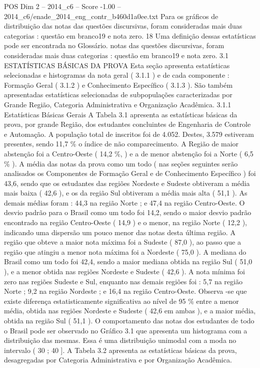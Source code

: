 \begin{textsample}{POS Dim 2 – 2014\_c6 – Score -1.00 – 2014\_c6/enade\_2014\_eng\_contr\_b460d1a0ee.txt}
Para os gráficos de distribuição das notas das questões discursivas, foram consideradas mais duas categorias : questão em branco19 e nota zero. 18 Uma definição dessas estatísticas pode ser encontrada no Glossário. notas das questões discursivas, foram consideradas mais duas categorias : questão em branco19 e nota zero. 3.1 ESTATÍSTICAS BÁSICAS DA PROVA Esta seção apresenta estatísticas selecionadas e histogramas da nota geral ( 3.1.1 ) e de cada componente : Formação Geral ( 3.1.2 ) e Conhecimento Específico ( 3.1.3 ).
São também apresentadas estatísticas selecionadas de subpopulações caracterizadas por Grande Região, Categoria Administrativa e Organização Acadêmica. 3.1.1 Estatísticas Básicas Gerais A Tabela 3.1 apresenta as estatísticas básicas da prova, por grande Região, dos estudantes concluintes de Engenharia de Controle e Automação.
A população total de inscritos foi de 4.052.
Destes, 3.579 estiveram presentes, sendo 11,7 \% o índice de não comparecimento.
A Região de maior abstenção foi a Centro-Oeste ( 14,2 \%, ) e a de menor abstenção foi a Norte ( 6,5 \% ).
A média das notas da prova como um todo ( nas seções seguintes serão analisados os Componentes de Formação Geral e de Conhecimento Específico ) foi 43,6, sendo que os estudantes das regiões Nordeste e Sudeste obtiveram a média mais baixa ( 42,6 ), e os da região Sul obtiveram a média mais alta ( 51,1 ).
As demais médias foram : 44,3 na região Norte ; e 47,4 na região Centro-Oeste.
O desvio padrão para o Brasil como um todo foi 14,2, sendo o maior desvio padrão encontrado na região Centro-Oeste ( 14,9 ) e o menor, na região Norte ( 12,2 ), indicando uma dispersão um pouco menor das notas desta última região.
A região que obteve a maior nota máxima foi a Sudeste ( 87,0 ), ao passo que a região que atingiu a menor nota máxima foi a Nordeste ( 75,0 ).
A mediana do Brasil como um todo foi 42,4, sendo a maior mediana obtida na região Sul ( 51,0 ), e a menor obtida nas regiões Nordeste e Sudeste ( 42,6 ).
A nota mínima foi zero nas regiões Sudeste e Sul, enquanto nas demais regiões foi : 5,7 na região Norte ; 9,2 na região Nordeste ; e 16,4 na região Centro-Oeste.
Observa -se que existe diferença estatisticamente significativa ao nível de 95 \% entre a menor média, obtida nas regiões Nordeste e Sudeste ( 42,6 em ambas ), e a maior média, obtida na região Sul ( 51,1 ).
O comportamento das notas dos estudantes de todo o Brasil pode ser observado no Gráfico 3.1 que apresenta um histograma com a distribuição das mesmas.
Essa é uma distribuição unimodal com a moda no intervalo ( 30 ; 40 ].
A Tabela 3.2 apresenta as estatísticas básicas da prova, desagregadas por Categoria Administrativa e por Organização Acadêmica.

\end{textsample}

